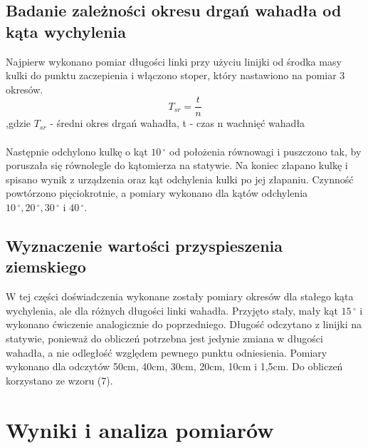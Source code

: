 \documentclass[a4paper,10pt]{article}
\begin{document}
\subsection{Badanie zależności okresu drgań wahadła od kąta wychylenia}
Najpierw wykonano pomiar długości linki przy użyciu linijki od środka masy kulki do punktu zaczepienia  i włączono stoper, który nastawiono na  pomiar 3 okresów. 
\begin{equation}
T_{sr} = \frac{t}{n}
\end{equation}
,gdzie $T_{sr}$ - średni okres drgań wahadła, t - czas n wachnięć wahadła
\\
\\Następnie odchylono kulkę o kąt $10\,^{\circ}$ od położenia równowagi i puszczono tak, by poruszała się równolegle do kątomierza na statywie. Na koniec złapano kulkę i spisano wynik z urządzenia oraz kąt odchylenia kulki po jej złapaniu. Czynność powtórzono pięciokrotnie, a pomiary wykonano dla kątów odchylenia  $10\,^{\circ}, 20\,^{\circ}, 30\,^{\circ}$ i $40\,^{\circ}$.

\subsection{Wyznaczenie wartości przyspieszenia ziemskiego}
W tej części doświadczenia wykonane zostały pomiary okresów dla stałego kąta wychylenia, ale dla różnych długości linki wahadła. Przyjęto stały, mały kąt $15\,^{\circ}$ i wykonano ćwiczenie analogicznie do poprzedniego. Długość odczytano z linijki na statywie, ponieważ do obliczeń potrzebna jest jedynie zmiana w długości wahadła, a nie odległość względem pewnego punktu odniesienia. Pomiary wykonano dla odczytów 50cm, 40cm, 30cm, 20cm, 10cm i 1,5cm. Do obliczeń korzystano ze wzoru (7).

\section{Wyniki i analiza pomiarów}
\end{document}
